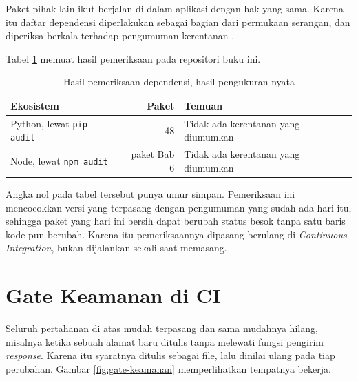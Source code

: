 Paket pihak lain ikut berjalan di dalam aplikasi dengan hak yang sama.
Karena itu daftar dependensi diperlakukan sebagai bagian dari permukaan
serangan, dan diperiksa berkala terhadap pengumuman kerentanan
\cite{pypa-advisory}.

Tabel \ref{tab:dependensi} memuat hasil pemeriksaan pada repositori buku ini.

\begin{table}[!htb]
  \centering
  \caption{Hasil pemeriksaan dependensi, hasil pengukuran nyata}
  \label{tab:dependensi}
  \begin{tabularx}{\textwidth}{lrX}
    \hline
    \textbf{Ekosistem} & \textbf{Paket} & \textbf{Temuan} \\
    \hline
    Python, lewat \texttt{pip-audit} & 48 & Tidak ada kerentanan yang diumumkan \\
    \hline
    Node, lewat \texttt{npm audit} & paket Bab 6 & Tidak ada kerentanan yang diumumkan \\
    \hline
  \end{tabularx}
\end{table}

Angka nol pada tabel tersebut punya umur simpan. Pemeriksaan ini mencocokkan
versi yang terpasang dengan pengumuman yang sudah ada hari itu, sehingga
paket yang hari ini bersih dapat berubah status besok tanpa satu baris kode
pun berubah. Karena itu pemeriksaannya dipasang berulang di
\textit{Continuous Integration}, bukan dijalankan sekali saat memasang.

\section{Gate Keamanan di CI}

Seluruh pertahanan di atas mudah terpasang dan sama mudahnya hilang, misalnya
ketika sebuah alamat baru ditulis tanpa melewati fungsi pengirim
\textit{response}. Karena itu syaratnya ditulis sebagai file, lalu dinilai
ulang pada tiap perubahan. Gambar \ref{fig:gate-keamanan} memperlihatkan
tempatnya bekerja.


